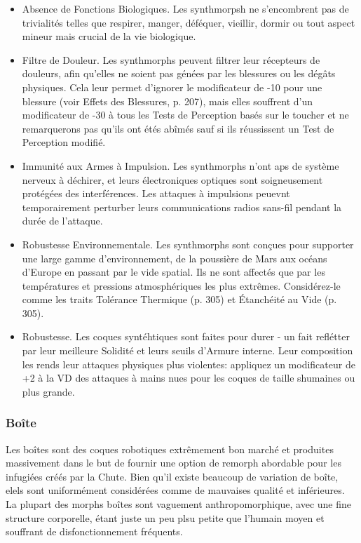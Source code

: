 \begin{itemize} \item Absence de Fonctions Biologiques. Les synthmorpsh ne s'encombrent pas de trivialités telles que respirer, manger, déféquer, vieillir, dormir ou tout aspect mineur mais crucial de la vie biologique. \item Filtre de Douleur. Les synthmorphs peuvent filtrer leur récepteurs de douleurs, afin qu'elles ne soient pas génées par les blessures ou les dégâts physiques. Cela leur permet d'ignorer le modificateur de -10 pour une blessure (voir Effets des Blessures, p. 207), mais elles souffrent d'un modificateur de -30 à tous les Tests de Perception basés sur le toucher et ne remarquerons pas qu'ils ont étés abîmés sauf si ils réussissent un Test de Perception modifié. \item Immunité aux Armes à Impulsion. Les synthmorphs n'ont aps de système nerveux à déchirer, et leurs électroniques optiques sont soigneusement protégées des interférences. Les attaques à impulsions peuevnt temporairement perturber leurs communications radios sans-fil pendant la durée de l'attaque. \item Robustesse Environnementale. Les synthmorphs sont conçues pour supporter une large gamme d'environnement, de la poussière de Mars aux océans d'Europe en passant par le vide spatial. Ils ne sont affectés que par les températures et pressions atmosphériques les plus extrêmes. Considérez-le comme les traits Tolérance Thermique (p. 305) et Étanchéité au Vide (p. 305). \item Robustesse. Les coques syntéhtiques sont faites pour durer - un fait reflétter par leur meilleure Solidité et leurs seuils d'Armure interne. Leur composition les rends leur attaques physiques plus violentes: appliquez un modificateur de +2 à la VD des attaques à mains nues pour les coques de taille shumaines ou plus grande. \end{itemize} 

\subsubsection{Boîte} \label{sec:starting-case} 

Les boîtes sont des coques robotiques extrêmement bon marché et produites massivement dans le but de fournir une option de remorph abordable pour les infugiées créés par la Chute. Bien qu'il existe beaucoup de variation de boîte, elels sont uniformément considérées comme de mauvaises qualité et inférieures. La plupart des morphs boîtes sont vaguement anthropomorphique, avec une fine structure corporelle, étant juste un peu plsu petite que l'humain moyen et souffrant de disfonctionnement fréquents. 

